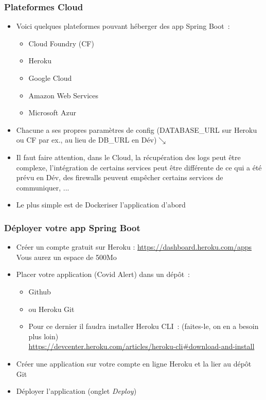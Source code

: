 \documentclass{beamer}
\begin{document}
\begin{frame}
	\frametitle{Plateformes Cloud}
	\begin{itemize}
		\item Voici quelques plateformes pouvant héberger des app Spring Boot~:
		\begin{itemize}
			\item Cloud Foundry (CF)
			\item Heroku
			\item Google Cloud
			\item Amazon Web Services
			\item Microsoft Azur
		\end{itemize}
	\item Chacune a ses propres paramètres de config (DATABASE\_URL sur Heroku ou CF par ex., au lieu de DB\_URL en Dév)$\searrow$
	
	\item Il faut faire attention, dans le Cloud, la récupération des logs peut être complexe, l'intégration de certains services peut être différente de ce qui a été prévu en Dév, des firewalls peuvent empêcher certains services de communiquer, ...
	\item Le plus simple est de Dockeriser l'application d'abord
	\end{itemize}
\end{frame} 

\begin{frame}
	\frametitle{Déployer votre app Spring Boot }
	\begin{itemize}
		\item Créer un compte gratuit sur Heroku : \url{https://dashboard.heroku.com/apps}\\
		Vous aurez un espace de 500Mo
		\item Placer votre application (Covid Alert) dans un dépôt~:
		\begin{itemize}
			\item Github
			\item ou Heroku Git
			\item[] Pour ce dernier il faudra installer Heroku CLI~: (faites-le, on en a besoin plus loin)\\
			\url{https://devcenter.heroku.com/articles/heroku-cli\#download-and-install}
		\end{itemize}   
		\item Créer une application sur votre compte en ligne Heroku et la lier au dépôt Git
		\item Déployer l'application (onglet \textit{Deploy})
\end{itemize}
\end{frame} 
\end{document}
